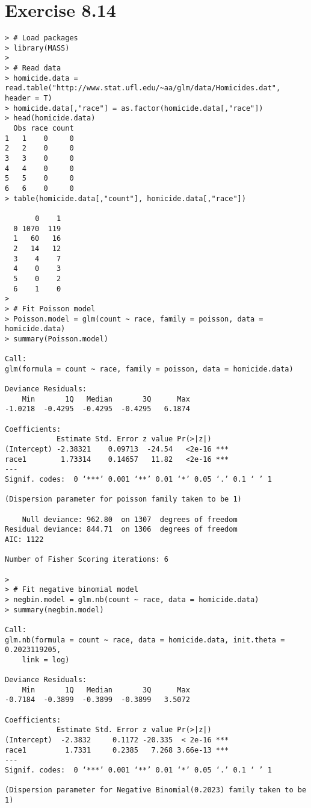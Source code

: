 \documentclass[a4paper]{article}
\begin{document}
\section{Exercise 8.14}
\begin{lstlisting}
> # Load packages
> library(MASS)
> 
> # Read data
> homicide.data = read.table("http://www.stat.ufl.edu/~aa/glm/data/Homicides.dat", header = T)
> homicide.data[,"race"] = as.factor(homicide.data[,"race"])
> head(homicide.data)
  Obs race count
1   1    0     0
2   2    0     0
3   3    0     0
4   4    0     0
5   5    0     0
6   6    0     0
> table(homicide.data[,"count"], homicide.data[,"race"])
   
       0    1
  0 1070  119
  1   60   16
  2   14   12
  3    4    7
  4    0    3
  5    0    2
  6    1    0
> 
> # Fit Poisson model
> Poisson.model = glm(count ~ race, family = poisson, data = homicide.data)
> summary(Poisson.model)

Call:
glm(formula = count ~ race, family = poisson, data = homicide.data)

Deviance Residuals: 
    Min       1Q   Median       3Q      Max  
-1.0218  -0.4295  -0.4295  -0.4295   6.1874  

Coefficients:
            Estimate Std. Error z value Pr(>|z|)    
(Intercept) -2.38321    0.09713  -24.54   <2e-16 ***
race1        1.73314    0.14657   11.82   <2e-16 ***
---
Signif. codes:  0 ‘***’ 0.001 ‘**’ 0.01 ‘*’ 0.05 ‘.’ 0.1 ‘ ’ 1

(Dispersion parameter for poisson family taken to be 1)

    Null deviance: 962.80  on 1307  degrees of freedom
Residual deviance: 844.71  on 1306  degrees of freedom
AIC: 1122

Number of Fisher Scoring iterations: 6

> 
> # Fit negative binomial model
> negbin.model = glm.nb(count ~ race, data = homicide.data)
> summary(negbin.model)

Call:
glm.nb(formula = count ~ race, data = homicide.data, init.theta = 0.2023119205, 
    link = log)

Deviance Residuals: 
    Min       1Q   Median       3Q      Max  
-0.7184  -0.3899  -0.3899  -0.3899   3.5072  

Coefficients:
            Estimate Std. Error z value Pr(>|z|)    
(Intercept)  -2.3832     0.1172 -20.335  < 2e-16 ***
race1         1.7331     0.2385   7.268 3.66e-13 ***
---
Signif. codes:  0 ‘***’ 0.001 ‘**’ 0.01 ‘*’ 0.05 ‘.’ 0.1 ‘ ’ 1

(Dispersion parameter for Negative Binomial(0.2023) family taken to be 1)


\end{lstlisting}
\end{document}
